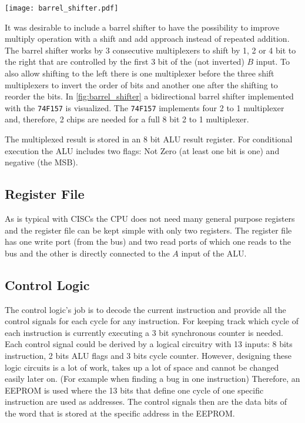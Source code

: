 \begin{sidewaysfigure}[p]
  \centering
  \texttt{[image: barrel\_shifter.pdf]}
  \caption{8 bit bidirectional barrel shifter.}
  \label{fig:barrel_shifter}
\end{sidewaysfigure}
It was desirable to include a barrel shifter to have the possibility to improve multiply operation with a shift and add approach instead of repeated addition.
The barrel shifter works by 3 consecutive multiplexers to shift by 1, 2 or 4 bit to the right that are controlled by the first 3 bit of the (not inverted) $B$ input.
To also allow shifting to the left there is one multiplexer before the three shift multiplexers to invert the order of bits and another one after the shifting to reorder the bits.
In \cref{fig:barrel_shifter} a bidirectional barrel shifter implemented with the \texttt{74F157} is visualized. The \texttt{74F157} implements four 2 to 1 multiplexer and, therefore, 2 chips are needed for a full 8 bit 2 to 1 multiplexer.

The multiplexed result is stored in an 8 bit \gls{ALU} result register.
For conditional execution the \gls{ALU} includes two flags: Not Zero (at least one bit is one) and negative (the \gls{MSB}).

\subsection{Register File}
As is typical with \glspl{CISC} the \gls{CPU} does not need many general purpose registers and the register file can be kept simple with only two registers.
The register file has one write port (from the bus) and two read ports of which one reads to the bus and the other is directly connected to the $A$ input of the \gls{ALU}.
\subsection{Control Logic}\label{ssec:cl}
The control logic's job is to decode the current instruction and provide all the control signals for each cycle for any instruction.
For keeping track which cycle of each instruction is currently executing a 3 bit synchronous counter is needed.
Each control signal could be derived by a logical circuitry with 13 inputs: 8 bits instruction, 2 bits \gls{ALU} flags and 3 bits cycle counter.
However, designing these logic circuits is a lot of work, takes up a lot of space and cannot be changed easily later on. (For example when finding a bug in one instruction)
Therefore, an \gls{EEPROM} is used where the 13 bits that define one cycle of one specific instruction are used as addresses.
The control signals then are the data bits of the word that is stored at the specific address in the \gls{EEPROM}.

